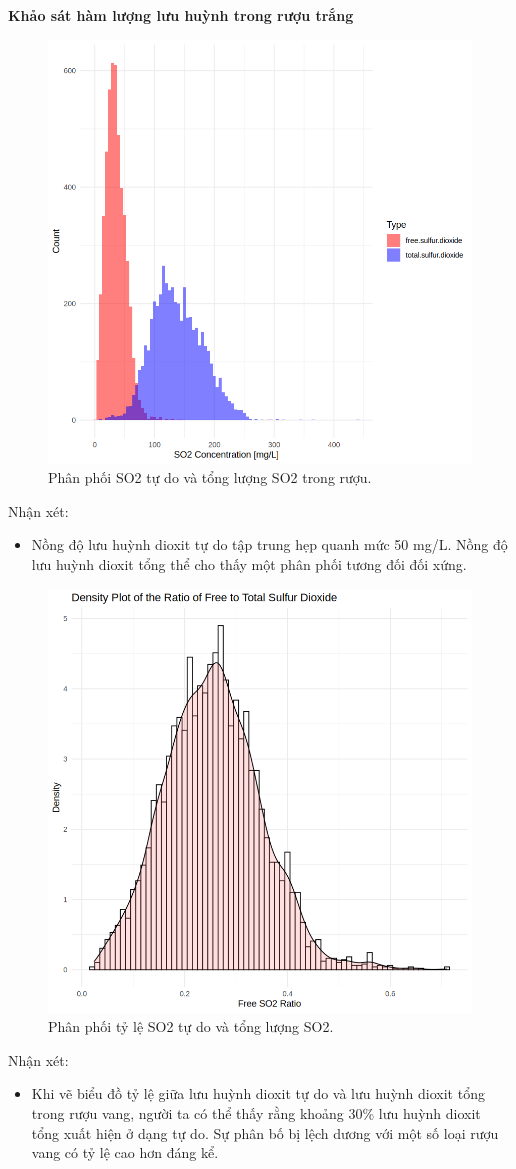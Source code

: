 \textbf{Khảo sát hàm lượng lưu huỳnh trong rượu trắng}
\begin{figure}[H]
    \centering
    \includegraphics[width=0.75\columnwidth]{wine_figures/white_sulfur_dis.png}
    \caption{Phân phối SO2 tự do và tổng lượng SO2 trong rượu.}
    \label{fig:white_sulfur_dis}
\end{figure}
Nhận xét:
\begin{itemize}
    \item Nồng độ lưu huỳnh dioxit tự do tập trung hẹp quanh mức 50 mg/L. Nồng độ lưu huỳnh dioxit tổng thể cho thấy một phân phối tương đối đối xứng.
\end{itemize}

\begin{figure}[H]
    \centering
    \includegraphics[width=0.75\columnwidth]{wine_figures/white_ratio.png}
    \caption{Phân phối tỷ lệ SO2 tự do và tổng lượng SO2.}
    \label{fig:white_free_so2}
\end{figure}
Nhận xét:
\begin{itemize}
    \item Khi vẽ biểu đồ tỷ lệ giữa lưu huỳnh dioxit tự do và lưu huỳnh dioxit tổng trong rượu vang, người ta có thể thấy rằng khoảng 30\% lưu huỳnh dioxit tổng xuất hiện ở dạng tự do. Sự phân bố bị lệch dương với một số loại rượu vang có tỷ lệ cao hơn đáng kể.
\end{itemize}

